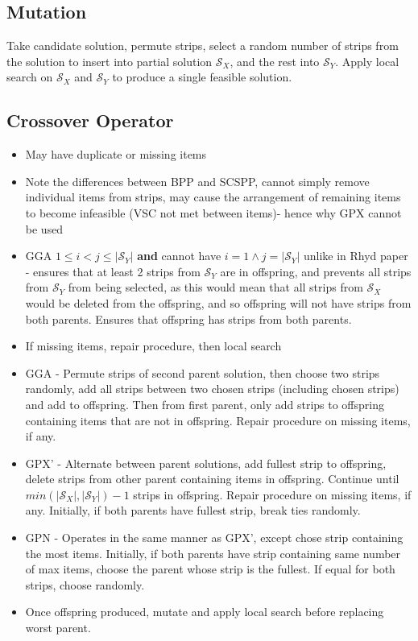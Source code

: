 \documentclass{elsarticle}
\begin{document}
\subsection{Mutation}
Take candidate solution, permute strips, select a random number of strips from the solution to insert into partial solution $\mathcal{S}_X$, and the rest into $\mathcal{S}_Y$. Apply local search on $\mathcal{S}_X$ and $\mathcal{S}_Y$ to produce a single feasible solution.

\subsection{Crossover Operator}
\begin{itemize}
	\item May have duplicate or missing items
	\item Note the differences between BPP and SCSPP, cannot simply remove individual items from strips, may cause the arrangement of remaining items to become infeasible (VSC not met between items)- hence why GPX cannot be used \cite{lewis2017}
	\item GGA $1 \leq i < j \leq |\mathcal{S}_Y|$ \textbf{and} cannot have $i = 1 \land j = |\mathcal{S}_Y|$ unlike in Rhyd paper - ensures that at least 2 strips from $\mathcal{S}_Y$ are in offspring, and prevents all strips from $\mathcal{S}_Y$ from being selected, as this would mean that all strips from $\mathcal{S}_X$ would be deleted from the offspring, and so offspring will not have strips from both parents. Ensures that offspring has strips from both parents.
	\item If missing items, repair procedure, then local search
	\item GGA - Permute strips of second parent solution, then choose two strips randomly, add all strips between two chosen strips (including chosen strips) and add to offspring. Then from first parent, only add strips to offspring containing items that are not in offspring. Repair procedure on missing items, if any.
	\item GPX' - Alternate between parent solutions, add fullest strip to offspring, delete strips from other parent containing items in offspring. Continue until $min(|\mathcal{S}_X|,|\mathcal{S}_Y|)-1$ strips in offspring. Repair procedure on missing items, if any. Initially, if both parents have fullest strip, break ties randomly.
	\item GPN - Operates in the same manner as GPX', except chose strip containing the most items. Initially, if both parents have strip containing same number of max items, choose the parent whose strip is the fullest. If equal for both strips, choose randomly.
	\item Once offspring produced, mutate and apply local search before replacing worst parent.
\end{itemize}
\end{document}
